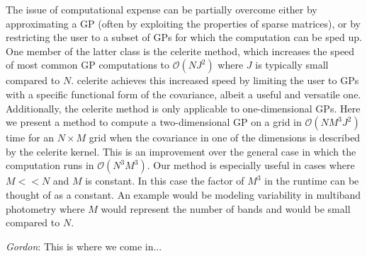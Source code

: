 \documentclass[modern]{aastex62}
\newcommand{\todo}[3]{{\color{#2}\emph{#1}: #3}}
\newcommand{\gordontodo}[1]{\todo{Gordon}{red}{#1}}
\newcommand{\project}[1]{\textsf{#1}}
\newcommand{\celerite}{\project{celerite }}
\begin{document}
	The issue of computational expense can be partially overcome either by approximating a GP (often by exploiting the properties of sparse 
	matrices), or by restricting the user to a subset of GPs for which the computation can be sped up. One member of the latter class is the 
	\celerite method, which increases the speed of most common GP computations to $\mathcal{O}(NJ^2)$ where $J$ is typically small compared 
	to $N$. \celerite achieves this increased speed by limiting the user to GPs with a specific functional form of the covariance, albeit a useful and 
	versatile one. Additionally, the \celerite method is only applicable to one-dimensional GPs. Here we present a method to compute a two-dimensional 
	GP on a grid in $\mathcal{O}(NM^3J^2)$ time for an $N\times M$ grid when the covariance in one of the dimensions is described by the \celerite 
	kernel. This is an improvement over the general case in which the computation runs in $\mathcal{O}(N^3M^3)$. Our method is especially useful 
	in cases where $M << N$ and $M$ is constant. In this case the factor of $M^3$ in the runtime can be thought of as a constant. An example would 
	be modeling variability in multiband photometry where $M$ would represent the number of bands and would be small compared to $N$. 
		
	\gordontodo{This is where we come in...}
		
\end{document}
